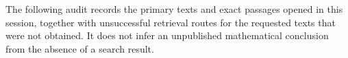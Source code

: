 
\begin{remark}\label{D:source-record}
The following audit records the primary texts and exact passages opened
in this session, together with unsuccessful retrieval routes for the
requested texts that were not obtained. It does not infer an unpublished
mathematical conclusion from the absence of a search result.
\end{remark}

